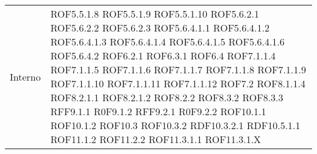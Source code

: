 \begin{center}
\begin{longtable}{| p{4cm} | p{4cm} |}
\hline
Interno & ROF5.5.1.8 \newline ROF5.5.1.9 \newline ROF5.5.1.10 \newline ROF5.6.2.1 \newline ROF5.6.2.2 \newline ROF5.6.2.3 \newline ROF5.6.4.1.1 \newline ROF5.6.4.1.2 \newline ROF5.6.4.1.3 \newline ROF5.6.4.1.4 \newline ROF5.6.4.1.5 \newline ROF5.6.4.1.6 \newline ROF5.6.4.2 \newline ROF6.2.1 \newline ROF6.3.1 \newline ROF6.4 \newline ROF7.1.1.4 \newline ROF7.1.1.5 \newline ROF7.1.1.6 \newline ROF7.1.1.7 \newline ROF7.1.1.8 \newline ROF7.1.1.9 \newline ROF7.1.1.10 \newline ROF7.1.1.11 \newline ROF7.1.1.12 \newline ROF7.2 \newline ROF8.1.1.4 \newline ROF8.2.1.1 \newline ROF8.2.1.2 \newline ROF8.2.2 \newline ROF8.3.2 \newline ROF8.3.3 \newline RFF9.1.1 \newline R0F9.1.2 \newline RFF9.2.1 \newline R0F9.2.2 \newline ROF10.1.1 \newline ROF10.1.2 \newline ROF10.3 \newline ROF10.3.2 \newline RDF10.3.2.1 \newline RDF10.5.1.1 \newline ROF11.1.2 \newline ROF11.2.2 \newline ROF11.3.1.1 \newline ROF11.3.1.X \\

\end{longtable}
\end{center}

